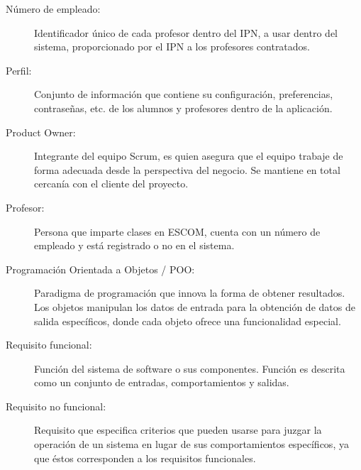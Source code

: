 \begin{description}
	\item[Número de empleado:] Identificador único de cada profesor dentro del IPN, a usar dentro del sistema, proporcionado por el IPN a los profesores contratados.

	\item[Perfil:] Conjunto de información que contiene su configuración, preferencias, contraseñas, etc. de los alumnos y profesores dentro de la aplicación.
	\item[Product Owner:] Integrante del equipo Scrum, es quien asegura que el equipo trabaje de forma adecuada desde la perspectiva del negocio. Se mantiene en total cercanía con el cliente del proyecto.
	\item[Profesor:] Persona que imparte clases en ESCOM, cuenta con un número de empleado y está registrado o no en el sistema.
	\item[Programación Orientada a Objetos / POO:] Paradigma de programación que innova la forma de obtener resultados. Los objetos manipulan los datos de entrada para la obtención de datos de salida específicos, donde cada objeto ofrece una funcionalidad especial.

	\item[Requisito funcional:] Función del sistema de software o sus componentes. Función es descrita como un conjunto de entradas, comportamientos y salidas.
	\item[Requisito no funcional:] Requisito que especifica criterios que pueden usarse para juzgar la operación de un sistema en lugar de sus comportamientos específicos, ya que éstos corresponden a los requisitos funcionales. 


\end{description}
